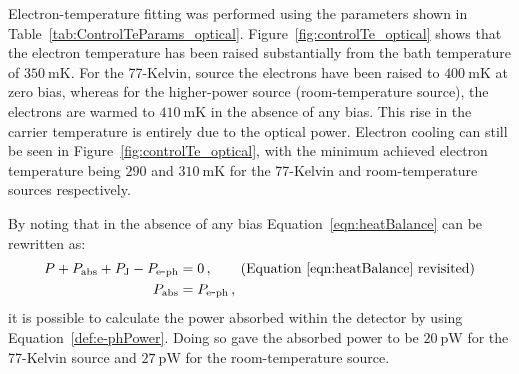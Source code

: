 Electron-temperature fitting was performed using the parameters shown in Table~\ref{tab:ControlTeParams_optical}. Figure~\ref{fig:controlTe_optical} shows that the electron temperature has been raised substantially from the bath temperature of $350~\mathrm{mK}$. For the 77-Kelvin, source the electrons have been raised to $400~\mathrm{mK}$ at zero bias, whereas for the higher-power source (room-temperature source), the electrons are warmed to $410~\mathrm{mK}$ in the absence of any bias. This rise in the carrier temperature is entirely due to the optical power. Electron cooling can still be seen in Figure~\ref{fig:controlTe_optical}, with the minimum achieved electron temperature being $290$ and $310~\mathrm{mK}$ for the 77-Kelvin and room-temperature sources respectively.
\par 
By noting that in the absence of any bias Equation~\ref{eqn:heatBalance} can be rewritten as:
\begin{align}
P + P_{\mathrm{abs}} + P_{\mathrm{J}} - P_{\mathrm{e\mbox{-}ph}} &= 0\,, \tag{Equation~\ref{eqn:heatBalance} revisited}\\
P_{\mathrm{abs}} &= P_{\mathrm{e\mbox{-}ph}}\,, \label{eqn:Pabs_V0}
\end{align}
it is possible to calculate the power absorbed within the detector by using Equation~\ref{def:e-phPower}. Doing so gave the absorbed power to be $20~\mathrm{pW}$ for the 77-Kelvin source and $27~\mathrm{pW}$ for the room-temperature source.
%
